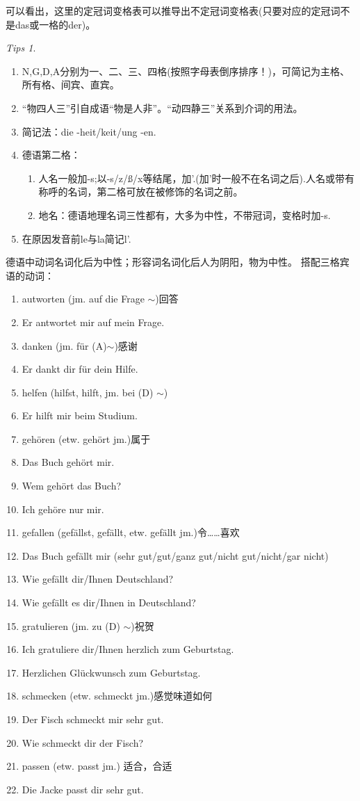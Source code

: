\documentclass[12pt,A4paper,oneside,reqno]{amsart}
\numberwithin{equation}{section}
\theoremstyle{plain}
\theoremstyle{plain}
\theoremstyle{plain}
\numberwithin{equation}{section}
\theoremstyle{remark}
\newtheorem{tips}[theorem]{Tips}
\begin{document}
可以看出，这里的定冠词变格表可以推导出不定冠词变格表(只要对应的定冠词不是das或一格的der)。
\begin{tips}\
	\begin{enumerate}[1.]
		\item N,G,D,A分别为一、二、三、四格(按照字母表倒序排序！)，可简记为主格、所有格、间宾、直宾。
		\item “物四人三”引自成语“物是人非”。“动四静三”关系到介词的用法。
		\item 简记法：die -heit/keit/ung -en.
		\item 德语第二格：
		\begin{enumerate}
			\item  人名一般加-s;以-s/z/\ss/x等结尾，加'.(加'时一般不在名词之后).人名或带有称呼的名词，第二格可放在被修饰的名词之前。
			\item 地名：德语地理名词三性都有，大多为中性，不带冠词，变格时加-s.
		\end{enumerate}
		\item 在原因发音前le与la简记l'.
	\end{enumerate}

\end{tips}
德语中动词名词化后为中性；形容词名词化后人为阴阳，物为中性。
搭配三格宾语的动词：
\begin{enumerate}[1.]
	\item autworten (jm. auf die Frage $\sim$)回答
	\item [] Er antwortet mir auf mein Frage.
	\item danken (jm. f\"{u}r (A)$\sim$)感谢
	\item [] Er dankt dir f\"{u}r dein Hilfe.
	\item helfen (hilfst, hilft, jm. bei (D) $\sim$)
	\item [] Er hilft mir beim Studium.
	\item geh\"{o}ren (etw. geh\"{o}rt jm.)属于
	\item []Das Buch geh\"{o}rt mir.
	\item [] Wem geh\"{o}rt das Buch?
	\item [] Ich geh\"{o}re nur mir.
	\item gefallen (gef\"{a}llst, gef\"{a}llt, etw. gef\"{a}llt jm.)令……喜欢
	\item [] Das Buch gef\"{a}llt mir (sehr gut/gut/ganz gut/nicht gut/nicht/gar nicht)
	\item [] Wie gef\"{a}llt dir/Ihnen Deutschland?
	\item [] Wie gef\"{a}llt es dir/Ihnen in Deutschland?
	\item gratulieren (jm. zu (D) $\sim$)祝贺
	\item []Ich gratuliere dir/Ihnen herzlich zum Geburtstag.
	\item [] Herzlichen Gl\"{u}ckwunsch zum Geburtstag.
	\item schmecken (etw. schmeckt jm.)感觉味道如何
	\item [] Der Fisch schmeckt mir sehr gut.
	\item [] Wie schmeckt dir der Fisch?
	\item passen (etw. passt jm.) 适合，合适
	\item []Die Jacke passt dir sehr gut.
\end{enumerate}
\end{document}
